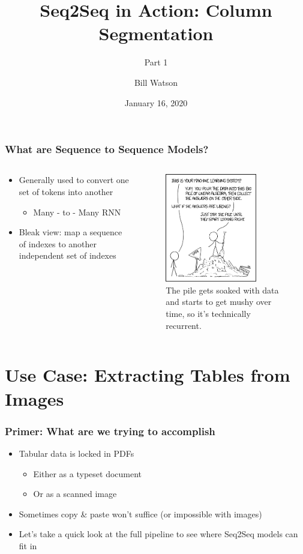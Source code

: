 \documentclass[usenames,dvipsnames]{beamer}
\title{Seq2Seq in Action: Column Segmentation}
\subtitle{Part 1}
\author{Bill Watson}
\institute{S\&P Global}
\date{January 16, 2020}
\begin{document}
\begin{frame}
\titlepage
\end{frame}


\begin{frame}
\frametitle{What are Sequence to Sequence Models?}
\begin{columns}
  \begin{column}{0.45\textwidth}
  \begin{itemize}
    \item Generally used to convert one set of tokens into another
    \begin{itemize}
      \item Many - to - Many RNN
    \end{itemize}
    \item Bleak view: map a sequence of indexes to another independent set of indexes
  \end{itemize}
  \end{column}
  \begin{column}{0.45\textwidth}
  \begin{figure}
    \includegraphics[width=4cm]{assets/machine_learning}
    \caption{The pile gets soaked with data and starts to get mushy over time, so it's technically recurrent.}
  \end{figure}
  \end{column}
\end{columns}
\end{frame}


\section{Use Case: Extracting Tables from Images}

\begin{frame}
  \frametitle{Primer: What are we trying to accomplish}
  \begin{itemize}
    \item Tabular data is locked in PDFs
    \begin{itemize}
      \item Either as a typeset document
      \item Or as a scanned image
    \end{itemize}
    \item Sometimes copy \& paste won't suffice (or impossible with images)
    \item Let's take a quick look at the full pipeline to see where Seq2Seq models can fit in
  \end{itemize}
\end{frame}
\end{document}

